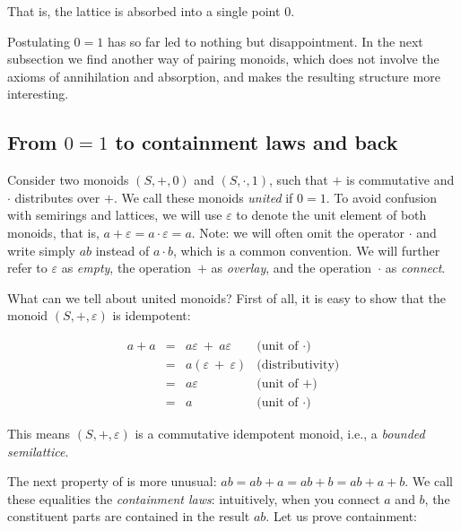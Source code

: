 \documentclass[english,submission]{programming}
\begin{document}
\noindent
That is, the lattice is absorbed into a single point $0$.

Postulating $0 = 1$ has so far led to nothing but disappointment. In the
next subsection we find another way of pairing monoids, which does not involve
the axioms of annihilation and absorption, and makes the resulting structure
more interesting.

\subsection{From $0=1$ to containment laws and back}

Consider two monoids $(S, +, 0)$ and $(S, \cdot, 1)$, such that $+$ is
commutative and $\cdot$ distributes over $+$. We call these monoids
\emph{united} if $0 = 1$. To avoid confusion with semirings and lattices, we
will use $\varepsilon$ to denote the unit element of both monoids, that is,
$a + \varepsilon = a \cdot \varepsilon = a$. Note: we will often omit the
operator $\cdot$ and write simply $\textit{ab}$ instead of $a \cdot b$, which is
a common convention. We will further refer to $\varepsilon$ as \emph{empty}, the
operation~$+$ as \emph{overlay}, and the operation~$\cdot$ as \emph{connect}.

What can we tell about united monoids? First of all, it is easy to show that the
monoid $(S, +, \varepsilon)$ is idempotent:

\vspace{-5mm}
\begin{equation*}
\begin{array}{rcll}
a + a & = & a\varepsilon\ +\ a\varepsilon & \text{(unit of $\cdot$)}\\
 & = & a(\varepsilon\ +\ \varepsilon) & \text{(distributivity)}\\
 & = & a\varepsilon & \text{(unit of $+$)}\\
 & = & a & \text{(unit of $\cdot$)}
\end{array}
\end{equation*}
\vspace{-3mm}

\noindent
This means $(S, +, \varepsilon)$ is a commutative idempotent monoid, i.e.,
a \emph{bounded semilattice}.

The next property of is more unusual:
$\textit{ab} = \textit{ab} + a = \textit{ab} + b = \textit{ab} + a + b$. We
call these equalities the \emph{containment laws}: intuitively, when you
connect $a$ and $b$, the constituent parts are contained in the result
$\textit{ab}$. Let us prove containment:
\end{document}
